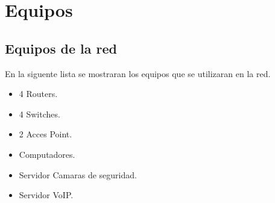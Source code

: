 \documentclass[12pt]{article}
\begin{document}

\pagebreak
\section{\textbf{Equipos}}
\subsection{\textbf{Equipos de la red}}
En la siguente lista se mostraran los equipos que se utilizaran en la red.
\begin{itemize}
\item
4 Routers.
\item
4 Switches.
\item
2 Acces Point.
\item
Computadores.
\item
Servidor Camaras de seguridad.
\item
Servidor VoIP. 
\end{itemize}
\end{document}
